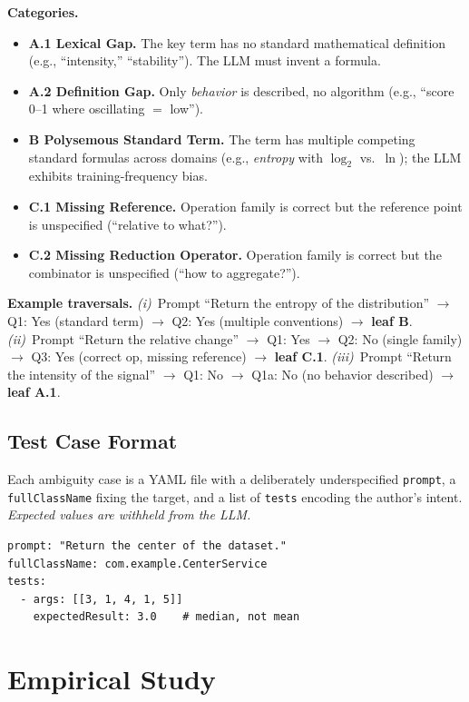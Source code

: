 \documentclass[conference]{IEEEtran}
\begin{document}
\textbf{Categories.}
\begin{itemize}\itemsep1pt
  \item \textbf{A.1 Lexical Gap.} The key term has no standard mathematical definition (e.g., ``intensity,'' ``stability''). The LLM must invent a formula.
  \item \textbf{A.2 Definition Gap.} Only \emph{behavior} is described, no algorithm (e.g., ``score 0--1 where oscillating $=$ low'').
  \item \textbf{B Polysemous Standard Term.} The term has multiple competing standard formulas across domains (e.g., \emph{entropy} with $\log_2$ vs.\ $\ln$); the LLM exhibits training-frequency bias.
  \item \textbf{C.1 Missing Reference.} Operation family is correct but the reference point is unspecified (``relative to what?'').
  \item \textbf{C.2 Missing Reduction Operator.} Operation family is correct but the combinator is unspecified (``how to aggregate?'').
\end{itemize}

\textbf{Example traversals.} \emph{(i)}~Prompt ``Return the entropy of the distribution'' $\rightarrow$ Q1: Yes (standard term) $\rightarrow$ Q2: Yes (multiple conventions) $\rightarrow$ \textbf{leaf B}. \emph{(ii)}~Prompt ``Return the relative change'' $\rightarrow$ Q1: Yes $\rightarrow$ Q2: No (single family) $\rightarrow$ Q3: Yes (correct op, missing reference) $\rightarrow$ \textbf{leaf C.1}. \emph{(iii)}~Prompt ``Return the intensity of the signal'' $\rightarrow$ Q1: No $\rightarrow$ Q1a: No (no behavior described) $\rightarrow$ \textbf{leaf A.1}.

\subsection{Test Case Format}
Each ambiguity case is a YAML file with a deliberately underspecified \texttt{prompt}, a \texttt{fullClassName} fixing the target, and a list of \texttt{tests} encoding the author's intent. \emph{Expected values are withheld from the LLM.}
\begin{lstlisting}
prompt: "Return the center of the dataset."
fullClassName: com.example.CenterService
tests:
  - args: [[3, 1, 4, 1, 5]]
    expectedResult: 3.0    # median, not mean
\end{lstlisting}

\section{Empirical Study}\label{sec:results}
\end{document}
